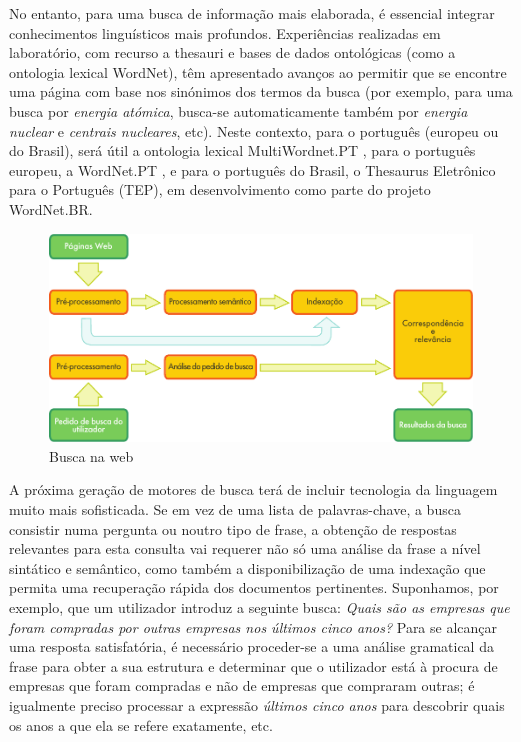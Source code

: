 \begin{multicols}{2}
No entanto, para uma busca de informação mais elaborada, é essencial integrar conhecimentos linguísticos mais profundos. 
Experiências realizadas em laboratório, com recurso a thesauri e bases de dados ontológicas (como a ontologia lexical WordNet), 
têm apresentado avanços ao permitir que se encontre uma página com base nos sinónimos dos termos da busca 
(por exemplo, para uma busca por \textit{energia atómica}, busca-se automaticamente também por \textit{energia nuclear} e \textit{centrais nucleares}, etc). 
Neste contexto, para o português (europeu ou do Brasil), será útil a ontologia lexical MultiWordnet.PT \cite{multiwordnet}, 
para o português europeu, a WordNet.PT \cite{wordnetpt},
e para o português do Brasil, o Thesaurus Eletrônico para o Português (TEP), em desenvolvimento como parte do projeto WordNet.BR.

\begin{figure}[htb]
  \center
  \includegraphics[width=\textwidth]{../_media/portuguese/web_search_architecture}
  \caption{Busca na web}
  \label{fig:websearcharch_de}
\end{figure}


A próxima geração de motores de busca terá de incluir tecnologia da linguagem muito mais sofisticada. 
Se em vez de uma lista de palavras-chave, a busca consistir numa pergunta ou noutro tipo de frase, a obtenção de respostas relevantes para esta consulta vai requerer não só uma análise da frase a nível sintático e semântico, como também a disponibilização de uma indexação que permita uma recuperação rápida dos documentos pertinentes. 
Suponhamos, por exemplo, que um utilizador introduz a seguinte busca: 
\textit{Quais são as empresas que foram compradas por ou\-tras empresas nos últimos cinco anos?}
Para se alcançar uma res\-pos\-ta satisfatória, é necessário proceder-se a uma análise gramatical da frase para obter a sua estrutura e determinar 
que o utilizador está à procura de empresas que foram compradas e não de empresas que compraram ou\-tras;
é igualmente preciso processar a expressão \textit{últimos cinco anos} para descobrir quais os anos a que ela se refere exatamente, etc.


\end{multicols}

